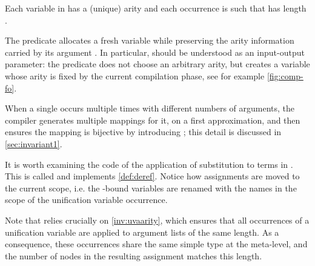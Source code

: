 \begin{invariant}\label{inv:uvaarity}
  Each variable 
  in \Ho has a (unique) arity  and each occurrence
   is such that  has length .
\end{invariant}

\noindent
{}

The predicate  allocates a fresh \Ho variable while preserving
the arity information carried by its argument . In particular,
 should be understood as an input-output parameter: the predicate does
not choose an arbitrary arity, but creates a variable whose arity is fixed by
the current compilation phase, see for example \cref{fig:comp-fo}.

\noindent
When a single  occurs multiple times with different numbers
of arguments, the compiler generates multiple mappings for it, on a first
approximation, and then ensures the mapping is bijective by introducing
\linketa; this detail is discussed in \cref{sec:invariant1}.

It is worth examining the code of the application of substitution to terms in
\Ho. This is called  and implements \cref{def:deref}. Notice how
assignments are moved to the current scope, i.e. the -bound variables
are renamed with the names in the scope of the unification variable occurrence.

\noindent
  \noindent
  
    

\mvspace

Note that  relies crucially on \cref{inv:uvaarity},
which ensures that all occurrences of a unification variable are
applied to argument lists of the same length. As a consequence, these
occurrences share the same simple type at the meta-level, and the
number of  nodes in the resulting assignment matches this
length.


